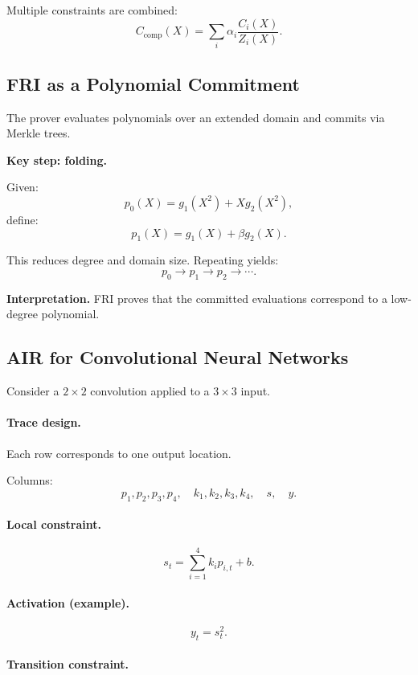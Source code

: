 Multiple constraints are combined:
\[
C_{\mathrm{comp}}(X) =
\sum_i \alpha_i \frac{C_i(X)}{Z_i(X)}.
\]

\subsection{FRI as a Polynomial Commitment}

The prover evaluates polynomials over an extended domain and commits via Merkle trees.

\medskip

\noindent
\textbf{Key step: folding.}

Given:
\[
p_0(X) = g_1(X^2) + X g_2(X^2),
\]
define:
\[
p_1(X) = g_1(X) + \beta g_2(X).
\]

This reduces degree and domain size. Repeating yields:
\[
p_0 \to p_1 \to p_2 \to \cdots.
\]

\medskip

\noindent
\textbf{Interpretation.}  
FRI proves that the committed evaluations correspond to a low-degree polynomial.

\subsection{AIR for Convolutional Neural Networks}

Consider a $2\times2$ convolution applied to a $3\times3$ input.

\paragraph{Trace design.}

Each row corresponds to one output location.

Columns:
\[
p_1,p_2,p_3,p_4,\quad
k_1,k_2,k_3,k_4,\quad
s,\quad y.
\]

\paragraph{Local constraint.}

\[
s_t = \sum_{i=1}^4 k_i p_{i,t} + b.
\]

\paragraph{Activation (example).}

\[
y_t = s_t^2.
\]

\paragraph{Transition constraint.}

